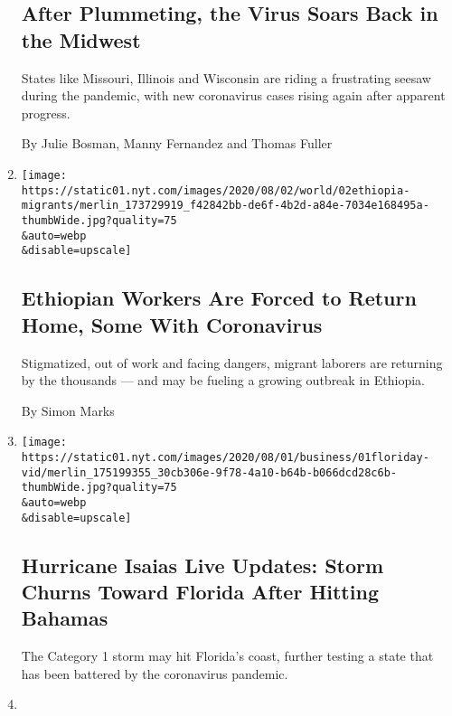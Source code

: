 \begin{enumerate}
  \hypertarget{after-plummeting-the-virus-soars-back-in-the-midwest}{%
  \subsection{After Plummeting, the Virus Soars Back in the
  Midwest}\label{after-plummeting-the-virus-soars-back-in-the-midwest}}

  States like Missouri, Illinois and Wisconsin are riding a frustrating
  seesaw during the pandemic, with new coronavirus cases rising again
  after apparent progress.

  By Julie Bosman, Manny Fernandez and Thomas Fuller
\item
  \href{/2020/08/01/world/africa/ethiopian-migrant-workers-coronavirus.html}{}

  \texttt{[image: https://static01.nyt.com/images/2020/08/02/world/02ethiopia-migrants/merlin\_173729919\_f42842bb-de6f-4b2d-a84e-7034e168495a-thumbWide.jpg?quality=75\\\&auto=webp\\\&disable=upscale]}

  \hypertarget{ethiopian-workers-are-forced-to-return-home-some-with-coronavirus}{%
  \subsection{Ethiopian Workers Are Forced to Return Home, Some With
  Coronavirus}\label{ethiopian-workers-are-forced-to-return-home-some-with-coronavirus}}

  Stigmatized, out of work and facing dangers, migrant laborers are
  returning by the thousands --- and may be fueling a growing outbreak
  in Ethiopia.

  By Simon Marks
\item
  \href{/2020/08/01/us/hurricane-isaias-updates.html}{}

  \texttt{[image: https://static01.nyt.com/images/2020/08/01/business/01floriday-vid/merlin\_175199355\_30cb306e-9f78-4a10-b64b-b066dcd28c6b-thumbWide.jpg?quality=75\\\&auto=webp\\\&disable=upscale]}

  \hypertarget{hurricane-isaias-live-updates-storm-churns-toward-florida-after-hitting-bahamas}{%
  \subsection{Hurricane Isaias Live Updates: Storm Churns Toward Florida
  After Hitting
  Bahamas}\label{hurricane-isaias-live-updates-storm-churns-toward-florida-after-hitting-bahamas}}

  The Category 1 storm may hit Florida's coast, further testing a state
  that has been battered by the coronavirus pandemic.
\item
  \href{/2020/08/01/world/coronavirus-covid-19.html}{}


\end{enumerate}
